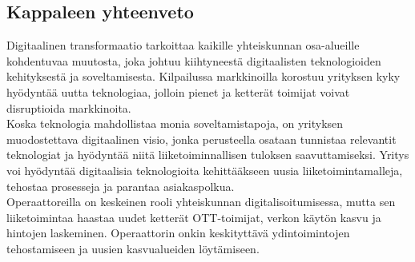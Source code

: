 \documentclass[finnish,12pt,a4paper,pdftex]{article}
\begin{document}







\subsection{Kappaleen yhteenveto}

Digitaalinen transformaatio tarkoittaa kaikille yhteiskunnan osa-alueille kohdentuvaa muutosta, joka johtuu kiihtyneestä digitaalisten teknologioiden kehityksestä ja soveltamisesta. 
Kilpailussa markkinoilla korostuu yrityksen kyky hyödyntää uutta teknologiaa, jolloin pienet ja ketterät toimijat voivat disruptioida markkinoita.\\

\noindent Koska teknologia mahdollistaa monia soveltamistapoja, on yrityksen muodostettava digitaalinen visio, jonka perusteella osataan tunnistaa relevantit teknologiat ja hyödyntää niitä liiketoiminnallisen tuloksen saavuttamiseksi. Yritys voi hyödyntää digitaalisia teknologioita kehittääkseen uusia liiketoimintamalleja, tehostaa prosesseja ja parantaa asiakaspolkua.\\

\noindent Operaattoreilla on keskeinen rooli yhteiskunnan digitalisoitumisessa, mutta sen liiketoimintaa haastaa uudet ketterät OTT-toimijat, verkon käytön kasvu ja hintojen laskeminen. Operaattorin onkin keskityttävä ydintoimintojen tehostamiseen ja uusien kasvualueiden löytämiseen.\\



\end{document}
